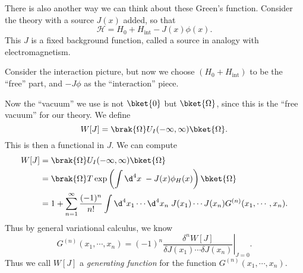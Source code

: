 \documentclass[a4paper]{article}
\begin{document}
%

There is also another way we can think about these Green's function. Consider the theory with a source $J(x)$ added, so that
\[
  \mathcal{H} = H_0 + H_{\mathrm{int}} - J(x) \phi(x).
\]
This $J$ is a fixed background function, called a source in analogy with electromagnetism.

Consider the interaction picture, but now we choose $(H_0 + H_{\mathrm{int}})$ to be the ``free'' part, and $-J \phi$ as the ``interaction'' piece.

Now the ``vacuum'' we use is not $\bket{0}$ but $\bket{\Omega}$, since this is the ``free vacuum'' for our theory.
We define
\[
  W[J] = \brak{\Omega}U_I(-\infty, \infty) \bket{\Omega}.
\]
This is then a functional in $J$. We can compute
\begin{align*}
  W[J] &= \brak{\Omega}U_I(-\infty, \infty) \bket{\Omega}\\
  &= \brak{\Omega} T \exp\left(\int \d^4 x\; -J(x) \phi_H(x)\right)\bket{\Omega}\\
  &= 1 + \sum_{n = 1}^\infty \frac{(-1)^n}{n!} \int \d^4 x_1 \cdots \d^4 x_n \; J(x_1) \cdots J(x_n) G^{(n)}(x_1, \cdots, x_n).
\end{align*}
Thus by general variational calculus, we know
\[
  G^{(n)}(x_1, \cdots, x_n) = (-1)^n \left.\frac{\delta^n W[J]}{\delta J(x_1) \cdots \delta J(x_n)} \right|_{J = 0}.
\]
Thus we call $W[J]$ a \emph{generating function} for the function $G^{(n)}(x_1, \cdots, x_n)$.
\end{document}

